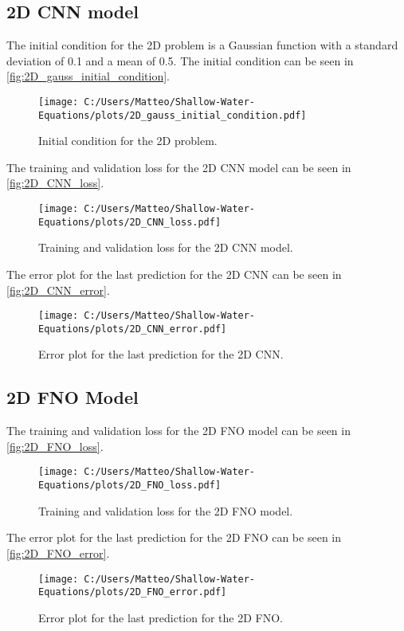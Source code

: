 \subsection{2D CNN model}
The initial condition for the 2D problem is a Gaussian function with a standard deviation of 0.1 and a mean of 0.5.
The initial condition can be seen in \autoref{fig:2D_gauss_initial_condition}.
\begin{figure}[H]
    \centering
    \texttt{[image: C:/Users/Matteo/Shallow-Water-Equations/plots/2D\_gauss\_initial\_condition.pdf]}
    \caption{Initial condition for the 2D problem.}\label{fig:2D_gauss_initial_condition}
\end{figure}

The training and validation loss for the 2D CNN model can be seen in \autoref{fig:2D_CNN_loss}.
\begin{figure}[H]
    \centering
    \texttt{[image: C:/Users/Matteo/Shallow-Water-Equations/plots/2D\_CNN\_loss.pdf]}
    \caption{Training and validation loss for the 2D CNN model.}\label{fig:2D_CNN_loss}
\end{figure}

The error plot for the last prediction for the 2D CNN can be seen in \autoref{fig:2D_CNN_error}.
\begin{figure}[H]
    \centering
    \texttt{[image: C:/Users/Matteo/Shallow-Water-Equations/plots/2D\_CNN\_error.pdf]}
    \caption{Error plot for the last prediction for the 2D CNN.}\label{fig:2D_CNN_error}
\end{figure}

\subsection{2D FNO Model}

The training and validation loss for the 2D FNO model can be seen in \autoref{fig:2D_FNO_loss}.
\begin{figure}[H]
    \centering
    \texttt{[image: C:/Users/Matteo/Shallow-Water-Equations/plots/2D\_FNO\_loss.pdf]}
    \caption{Training and validation loss for the 2D FNO model.}\label{fig:2D_FNO_loss}
\end{figure}

The error plot for the last prediction for the 2D FNO can be seen in \autoref{fig:2D_FNO_error}.
\begin{figure}[H]
    \centering
    \texttt{[image: C:/Users/Matteo/Shallow-Water-Equations/plots/2D\_FNO\_error.pdf]}
    \caption{Error plot for the last prediction for the 2D FNO.}\label{fig:2D_FNO_error}
\end{figure}

